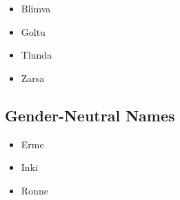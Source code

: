 \begin{itemize}
	\item {} Blimva 
	\item {} Goltu 
	\item {} Tlunda 
	\item {} Zarsa 
\end{itemize}

\subsection{Gender-Neutral Names}
\label{subsec:tvk-names-neut}

\begin{itemize}
	\item {} Erme 
	\item {} Inki 
	\item {} Ronne 
\end{itemize}

